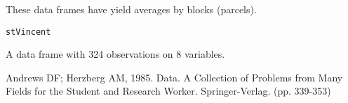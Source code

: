 \begin{Description}\relax
These data frames have yield averages by blocks (parcels).
\end{Description}
\begin{Usage}
\begin{verbatim}stVincent\end{verbatim}
\end{Usage}
\begin{Format}\relax
A data frame with 324 observations on 8 variables.
\end{Format}
\begin{Source}\relax
Andrews DF; Herzberg AM, 1985. Data. A Collection of Problems from
Many Fields for the Student and Research Worker. Springer-Verlag.
(pp. 339-353)
\end{Source}


